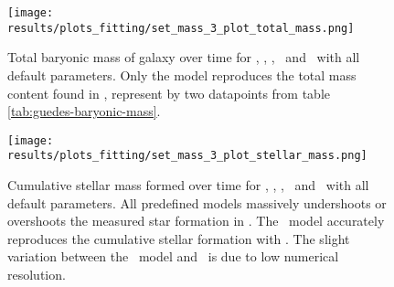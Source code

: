 \begin{figure}[h]
  \centering
  \texttt{[image: results/plots\_fitting/set\_mass\_3\_plot\_total\_mass.png]}
  \caption[]{\label{fig:fit-v1-3-total}
    Total baryonic mass of galaxy over time for \eris, \fiduccialomega, \mwomega, \mwcomega\ and \omegamodel\ with all default parameters.
    Only the \fiduccialomega model reproduces the total mass content found in \eris, represent by two datapoints from table \ref{tab:guedes-baryonic-mass}.
  }
\end{figure}
\begin{figure}[h]
  \centering
  \texttt{[image: results/plots\_fitting/set\_mass\_3\_plot\_stellar\_mass.png]}
  \caption[]{\label{fig:fit-v1-3-stellar}
    Cumulative stellar mass formed over time for \eris, \mwomega, \mwcomega, \fiduccialomega\ and \omegamodel\ with all default parameters.
    All predefined models massively undershoots or overshoots the measured star formation in \eris.
    The \fiduccialomega\ model accurately reproduces the cumulative stellar formation with \eris. The slight variation between the \fiduccialomega\ model and \eris\ is due to low numerical resolution.
  }
\end{figure}
\FloatBarrier

